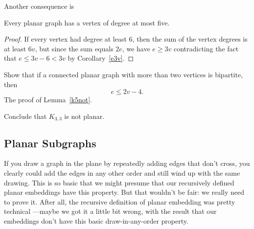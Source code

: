 Another consequence is
\begin{lemma}\label{d5}
Every planar graph has a vertex of degree at most five.
\end{lemma}

\begin{proof}
If every vertex had degree at least 6, then the sum of the
vertex degrees is at least $6v$, but since the sum equals $2e$, we have
$e \geq 3v$ contradicting the fact that $e \leq 3v-6 < 3v$ by Corollary~\ref{e3v}.
\end{proof}

\begin{notesproblem}\label{e2v}
\bparts

\ppart
Show that if a connected planar graph with more than two vertices is
bipartite, then
\begin{equation}\label{2v}
e \leq 2v -4.
\end{equation}
\hint The proof of Lemma~\ref{k5not}.


\ppart\label{k33not} Conclude that $K_{3,3}$ is not planar.


\eparts
\end{notesproblem}

\subsection{Planar Subgraphs}

If you draw a graph in the plane by repeatedly adding edges that don't
cross, you clearly could add the edges in any other order and still wind
up with the same drawing.  This is so basic that we might presume that our
recursively defined planar embeddings have this property.  But that
wouldn't be fair: we really need to prove it.  After all, the recursive
definition of planar embedding was pretty technical ---maybe we got it a
little bit wrong, with the result that our embeddings don't have this basic
draw-in-any-order property.

